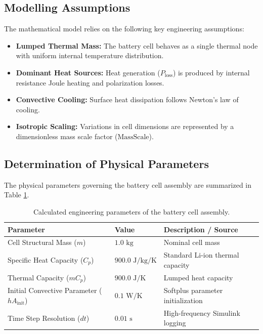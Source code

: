 \documentclass[12pt,a4paper]{article}
\begin{document}
\subsection{Modelling Assumptions}
The mathematical model relies on the following key engineering assumptions:
\begin{itemize}
    \item \textbf{Lumped Thermal Mass:} The battery cell behaves as a single thermal node with uniform internal temperature distribution.
    \item \textbf{Dominant Heat Sources:} Heat generation ($P_{\text{loss}}$) is produced by internal resistance Joule heating and polarization losses.
    \item \textbf{Convective Cooling:} Surface heat dissipation follows Newton's law of cooling.
    \item \textbf{Isotropic Scaling:} Variations in cell dimensions are represented by a dimensionless mass scale factor ($\text{MassScale}$).
\end{itemize}

\subsection{Determination of Physical Parameters}
The physical parameters governing the battery cell assembly are summarized in Table \ref{tab:physical_params}.

\begin{table}[h]
\centering
\caption{Calculated engineering parameters of the battery cell assembly.}
\label{tab:physical_params}
\begin{tabularx}{\textwidth}{@{}l l X@{}}
\toprule
Parameter & Value & Description / Source \\
\midrule
Cell Structural Mass ($m$) & $1.0\text{ kg}$ & Nominal cell mass \\
Specific Heat Capacity ($C_p$) & $900.0\text{ J/kg/K}$ & Standard Li-ion thermal capacity \\
Thermal Capacity ($m C_p$) & $900.0\text{ J/K}$ & Lumped heat capacity \\
Initial Convective Parameter ($hA_{\text{init}}$) & $0.1\text{ W/K}$ & Softplus parameter initialization \\
Time Step Resolution ($dt$) & $0.01\text{ s}$ & High-frequency Simulink logging \\
\bottomrule
\end{tabularx}
\end{table}
\end{document}

